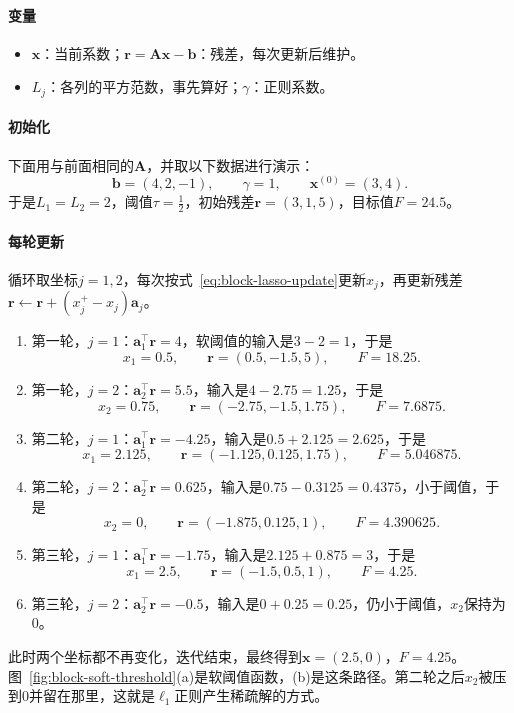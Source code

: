 \paragraph{变量}
\begin{itemize}
 \item $\bm{x}$：当前系数；$\bm{r}=\bm{A}\bm{x}-\bm{b}$：残差，每次更新后维护。
 \item $L_j$：各列的平方范数，事先算好；$\gamma$：正则系数。
\end{itemize}

\paragraph{初始化}
下面用与前面相同的$\bm{A}$，并取以下数据进行演示：
\[
 \bm{b}=(4,2,-1),\qquad \gamma=1,\qquad \bm{x}^{(0)}=(3,4).
\]
于是$L_1=L_2=2$，阈值$\tau=\tfrac12$，初始残差$\bm{r}=(3,1,5)$，目标值$F=24.5$。

\paragraph{每轮更新}
循环取坐标$j=1,2$，每次按式~\eqref{eq:block-lasso-update}更新$x_j$，再更新残差$\bm{r}\leftarrow\bm{r}+(x_j^{+}-x_j)\bm{a}_j$。

\begin{enumerate}
 \item 第一轮，$j=1$：$\bm{a}_1^\top\bm{r}=4$，软阈值的输入是$3-2=1$，于是
 \[
  x_1=0.5,\qquad \bm{r}=(0.5,-1.5,5),\qquad F=18.25 .
 \]
 \item 第一轮，$j=2$：$\bm{a}_2^\top\bm{r}=5.5$，输入是$4-2.75=1.25$，于是
 \[
  x_2=0.75,\qquad \bm{r}=(-2.75,-1.5,1.75),\qquad F=7.6875 .
 \]
 \item 第二轮，$j=1$：$\bm{a}_1^\top\bm{r}=-4.25$，输入是$0.5+2.125=2.625$，于是
 \[
  x_1=2.125,\qquad \bm{r}=(-1.125,0.125,1.75),\qquad F=5.046875 .
 \]
 \item 第二轮，$j=2$：$\bm{a}_2^\top\bm{r}=0.625$，输入是$0.75-0.3125=0.4375$，小于阈值，于是
 \[
  x_2=0,\qquad \bm{r}=(-1.875,0.125,1),\qquad F=4.390625 .
 \]
 \item 第三轮，$j=1$：$\bm{a}_1^\top\bm{r}=-1.75$，输入是$2.125+0.875=3$，于是
 \[
  x_1=2.5,\qquad \bm{r}=(-1.5,0.5,1),\qquad F=4.25 .
 \]
 \item 第三轮，$j=2$：$\bm{a}_2^\top\bm{r}=-0.5$，输入是$0+0.25=0.25$，仍小于阈值，$x_2$保持为$0$。
\end{enumerate}

此时两个坐标都不再变化，迭代结束，最终得到$\bm{x}=(2.5,0)$，$F=4.25$。图~\ref{fig:block-soft-threshold}(a)是软阈值函数，(b)是这条路径。第二轮之后$x_2$被压到$0$并留在那里，这就是$\ell_1$正则产生稀疏解的方式。


